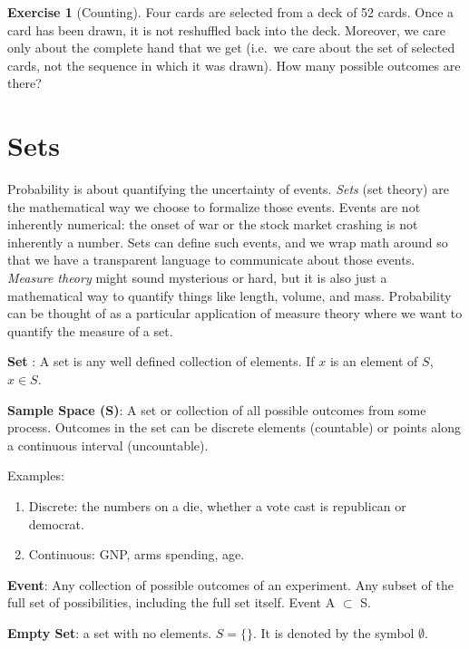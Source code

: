 \documentclass[
]{book}
\providecommand{\tightlist}{%
  \setlength{\itemsep}{0pt}\setlength{\parskip}{0pt}}
\theoremstyle{definition}
\theoremstyle{definition}
\theoremstyle{definition}
\newtheorem{exercise}{Exercise}[chapter]
\theoremstyle{definition}
\theoremstyle{remark}
\begin{document}
\begin{exercise}[Counting]
\protect\hypertarget{exr:counting1}{}{\label{exr:counting1} {} }
Four cards are selected from a deck of 52 cards. Once a card has been drawn, it is not reshuffled back into the deck. Moreover, we care only about the complete hand that we get (i.e.~we care about the set of selected cards, not the sequence in which it was drawn). How many possible outcomes are there?
\end{exercise}

\hypertarget{setoper}{%
\section{Sets}\label{setoper}}

Probability is about quantifying the uncertainty of events. \emph{Sets} (set theory) are the mathematical way we choose to formalize those events. Events are not inherently numerical: the onset of war or the stock market crashing is not inherently a number. Sets can define such events, and we wrap math around so that we have a transparent language to communicate about those events. \emph{Measure theory} might sound mysterious or hard, but it is also just a mathematical way to quantify things like length, volume, and mass. Probability can be thought of as a particular application of measure theory where we want to quantify the measure of a set.

\textbf{Set} : A set is any well defined collection of elements. If \(x\) is an element of \(S\), \(x \in S\).

\textbf{Sample Space (S)}: A set or collection of all possible outcomes from some process. Outcomes in the set can be discrete elements (countable) or points along a continuous interval (uncountable).

Examples:

\begin{enumerate}
\def\labelenumi{\arabic{enumi}.}
\tightlist
\item
  Discrete: the numbers on a die, whether a vote cast is republican or democrat.
\item
  Continuous: GNP, arms spending, age.
\end{enumerate}

\textbf{Event}: Any collection of possible outcomes of an experiment. Any subset of the full set of possibilities, including the full set itself. Event A \(\subset\) S.

\textbf{Empty Set}: a set with no elements. \(S = \{\}\). It is denoted by the symbol \(\emptyset\).
\end{document}
